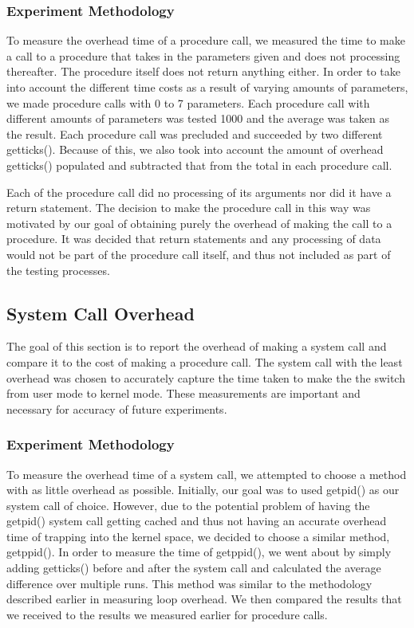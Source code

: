 \documentclass{article} %
\begin{document}
\subsubsection{Experiment Methodology}
To measure the overhead time of a procedure call, we measured the time to make a call to a procedure that takes in the parameters given and does not processing thereafter. The procedure itself does not return anything either. In order to take into account the different time costs as a result of varying amounts of parameters, we made procedure calls with 0 to 7 parameters. Each procedure call with different amounts of parameters was tested 1000 and the average was taken as the result. Each procedure call was precluded and succeeded by two different getticks(). Because of this, we also took into account the amount of overhead getticks() populated and subtracted that from the total in each procedure call. 

Each of the procedure call did no processing of its arguments nor did it have a return statement. The decision to make the procedure call in this way was motivated by our goal of obtaining purely the overhead of making the call to a procedure. It was decided that return statements and any processing of data would not be part of the procedure call itself, and thus not included as part of the testing processes. 

\subsection{System Call Overhead}
The goal of this section is to report the overhead of making a system call and compare it to the cost of making a procedure call. The system call with the least overhead was chosen to accurately capture the time taken to make the the switch from user mode to kernel mode. These measurements are important and necessary for accuracy of future experiments.

\subsubsection{Experiment Methodology}
To measure the overhead time of a system call, we attempted to choose a method with as little overhead as possible. Initially, our goal was to used getpid() as our system call of choice. However, due to the potential problem of having the getpid() system call getting cached and thus not having an accurate overhead time of trapping into the kernel space, we decided to choose a similar method, getppid(). In order to measure the time of getppid(), we went about by simply adding getticks() before and after the system call and calculated the average difference over multiple runs. This method was similar to the methodology described earlier in measuring loop overhead. We then compared the results that we received to the results we measured earlier for procedure calls.
\end{document}

